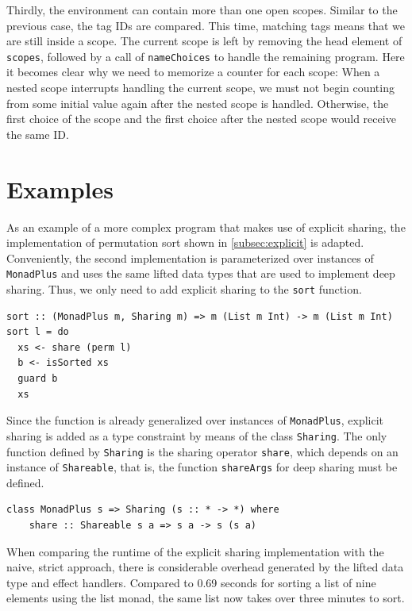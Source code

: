 \documentclass[a4paper, 11pt, fleqn, twoside]{scrreprt}
\newcommand{\hinl}[1]{\texttt{#1}}
\begin{document}
Thirdly, the environment can contain more than one open scopes.
Similar to the previous case, the tag IDs are compared.
This time, matching tags means that we are still inside a scope.
The current scope is left by removing the head element of \hinl{scopes}, followed by a call of \hinl{nameChoices} to handle the remaining program.
Here it becomes clear why we need to memorize a counter for each scope: When a nested scope interrupts handling the current scope, we must not begin counting from some initial value again after the nested scope is handled.
Otherwise, the first choice of the scope and the first choice after the nested scope would receive the same ID.

\section{Examples}

As an example of a more complex program that makes use of explicit sharing, the implementation of permutation sort shown in \autoref{subsec:explicit} is adapted.
Conveniently, the second implementation is parameterized over instances of \hinl{MonadPlus} and uses the same lifted data types that are used to implement deep sharing.
Thus, we only need to add explicit sharing to the \hinl{sort} function.

\begin{verbatim}
sort :: (MonadPlus m, Sharing m) => m (List m Int) -> m (List m Int)
sort l = do
  xs <- share (perm l)
  b <- isSorted xs
  guard b
  xs
\end{verbatim}

Since the function is already generalized over instances of \hinl{MonadPlus}, explicit sharing is added as a type constraint by means of the class \hinl{Sharing}.
The only function defined by \hinl{Sharing} is the sharing operator \hinl{share}, which depends on an instance of \hinl{Shareable}, that is, the function \hinl{shareArgs} for deep sharing must be defined.

\begin{verbatim}
class MonadPlus s => Sharing (s :: * -> *) where
    share :: Shareable s a => s a -> s (s a)
\end{verbatim}

When comparing the runtime of the explicit sharing implementation with the naive, strict approach, there is considerable overhead generated by the lifted data type and effect handlers.
Compared to 0.69 seconds for sorting a list of nine elements using the list monad, the same list now takes over three minutes to sort.
\end{document}
